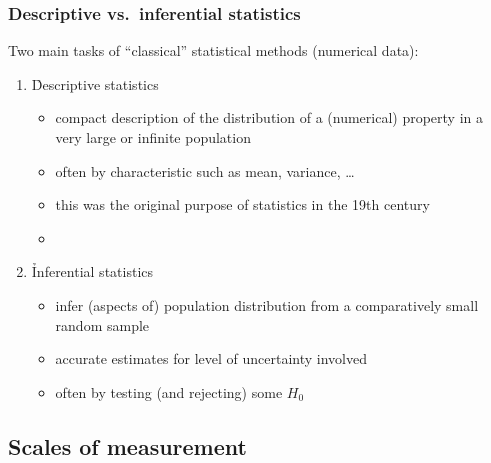 \documentclass[t]{beamer} %
\begin{document}
\begin{frame}
  \frametitle{Descriptive vs.\ inferential statistics}
  
  Two main tasks of ``classical'' statistical methods (numerical data):
  
  \gap\pause
  \begin{enumerate}
  \item \h{Descriptive statistics}
    \begin{itemize}
    \item compact description of the distribution of a (numerical) property in
      a very large or infinite population
    \item often by characteristic  such as mean, variance,
      \ldots
    \item this was the original purpose of statistics in the 19th century
    \item[]
    \end{itemize}
    \pause
  \item \h{Inferential statistics}
    \begin{itemize}
    \item infer (aspects of) population distribution from a comparatively small
      random sample
    \item accurate estimates for level of uncertainty involved
    \item often by testing (and rejecting) some  $H_0$
    \end{itemize}
  \end{enumerate}
\end{frame}

\subsection{Scales of measurement}
\end{document}
